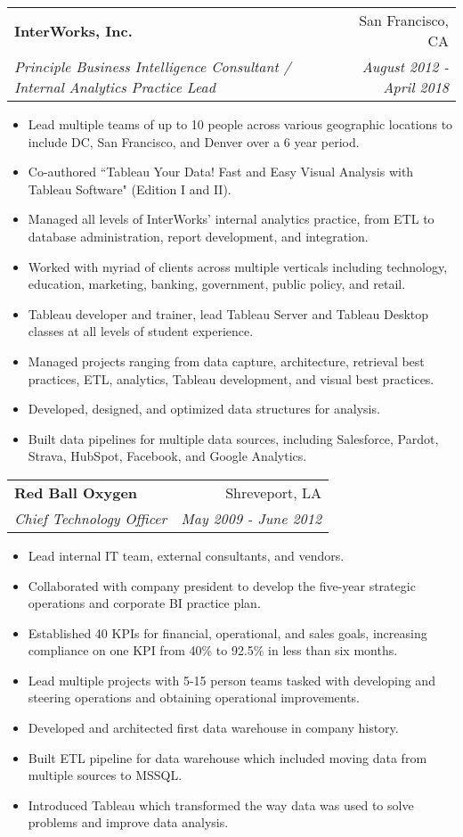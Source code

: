 \documentclass[letterpaper,11pt]{article}
\makeatletter
\newcommand{\resumeItem}[2]{
  \item\small{
    {#1}{ #2 \vspace{-2pt}}
  }
}
\newcommand{\resumeSubheading}[4]{
  \vspace{-2pt}\item
    \begin{tabular*}{0.97\textwidth}{l@{\extracolsep{\fill}}r}
      \textbf{#1} & #2 \\
      \textit{\small#3} & \textit{\small #4} \\
    \end{tabular*}\vspace{-5pt}
}
\newcommand{\resumeItemListStart}{\begin{itemize}}
\newcommand{\resumeItemListEnd}{\end{itemize}\vspace{-5pt}}
\makeatother
\begin{document}
    \resumeSubheading
      {InterWorks, Inc.}{San Francisco, CA}
      {Principle Business Intelligence Consultant / Internal Analytics Practice Lead}{August 2012 - April 2018}
      \resumeItemListStart
        \resumeItem{}
          {Lead multiple teams of up to 10 people across various geographic locations to include DC, San Francisco, and Denver over a 6 year period.}
        \resumeItem{}
          {Co-authored ``Tableau Your Data! Fast and Easy Visual Analysis with Tableau Software" (Edition I and II).}
        \resumeItem{}
          {Managed all levels of InterWorks' internal analytics practice, from ETL to database administration, report development, and integration.}
        \resumeItem{}
          {Worked with myriad of clients across multiple verticals including technology, education, marketing, banking, government, public policy, and retail.}
        \resumeItem{}
          {Tableau developer and trainer, lead Tableau Server and Tableau Desktop classes at all levels of student experience.}
        \resumeItem{}
          {Managed projects ranging from data capture, architecture, retrieval best practices, ETL, analytics, Tableau development, and visual best practices.}
        \resumeItem{}
          {Developed, designed, and optimized data structures for analysis.}
        \resumeItem{}
          {Built data pipelines for multiple data sources, including Salesforce, Pardot, Strava, HubSpot, Facebook, and Google Analytics.}
      \resumeItemListEnd
      
    \resumeSubheading
      {Red Ball Oxygen}{Shreveport, LA}
      {Chief Technology Officer}{May 2009 - June 2012}
      \resumeItemListStart
        \resumeItem{}
          {Lead internal IT team, external consultants, and vendors.}
        \resumeItem{}
          {Collaborated with company president to develop the five-year strategic operations and corporate BI practice plan.}
        \resumeItem{}
          {Established 40 KPIs for financial, operational, and sales goals, increasing compliance on one KPI from 40\% to 92.5\% in less than six months.}
        \resumeItem{}
          {Lead multiple projects with 5-15 person teams tasked with developing and steering operations and obtaining operational improvements.}
        \resumeItem{}
          {Developed and architected first data warehouse in company history.}
        \resumeItem{}
          {Built ETL pipeline for data warehouse which included moving data from multiple sources to MSSQL.}
        \resumeItem{}
          {Introduced Tableau which transformed the way data was used to solve problems and improve data analysis.}
      \resumeItemListEnd
\end{document}
